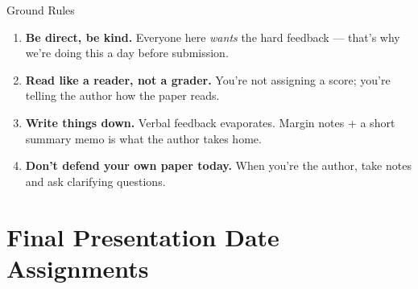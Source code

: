 \begin{frame}{Ground Rules}
  \begin{enumerate}
    \item \textbf{Be direct, be kind.} Everyone here \emph{wants} the hard feedback --- that's why we're doing this a day before submission.

    \vspace{4pt}

    \item \textbf{Read like a reader, not a grader.} You're not assigning a score; you're telling the author how the paper reads.

    \vspace{4pt}

    \item \textbf{Write things down.} Verbal feedback evaporates. Margin notes + a short summary memo is what the author takes home.

    \vspace{4pt}

    \item \textbf{Don't defend your own paper today.} When you're the author, take notes and ask clarifying questions.
  \end{enumerate}
\end{frame}

\section{Final Presentation Date Assignments}

